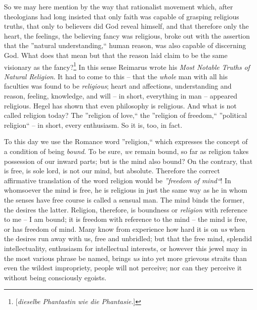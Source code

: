 \documentclass[12pt,a4paper]{book}
\begin{document}
So we may here mention by the way that rationalist movement which, after 
theologians had long insisted that only faith was capable of grasping 
religious truths, that only to believers did God reveal himself, and that 
therefore only the heart, the feelings, the believing fancy was religious, 
broke out with the assertion that the ''natural understanding,`` human 
reason, was also capable of discerning God. What does that mean but that the 
reason laid claim to be the same visionary as the 
fancy?\footnote{[\textit{dieselbe Phantastin wie die Phantasie.}]} In this 
sense Reimarus wrote his \textit{Most Notable Truths of Natural Religion}. It 
had to come to this -- that the \textit{whole} man with all his faculties was 
found to be \textit{religious}; heart and affections, understanding and 
reason, feeling, knowledge, and will -- in short, everything in man -- 
appeared religious. Hegel has shown that even philosophy is religious. And 
what is not called religion today? The ''religion of love,`` the ''religion 
of freedom,`` ''political religion`` -- in short, every enthusiasm. So it 
is, too, in fact.

To this day we use the Romance word ''religion,`` which expresses the 
concept of a condition of being \textit{bound}. To be sure, \textit{we} remain 
bound, so far as religion takes possession of our inward parts; but is the 
mind also bound? On the contrary, that is free, is sole lord, is not our mind, 
but absolute. Therefore the correct affirmative translation of the word 
religion would be \textit{''freedom of mind``}! In whomsoever the mind is 
free, he is religious in just the same way as he in whom the senses have free 
course is called a sensual man. The mind binds the former, the desires the 
latter. Religion, therefore, is boundness or \textit{religion} with reference 
to me -- I am bound; it is freedom with reference to the mind -- the mind is 
free, or has freedom of mind. Many know from experience how hard it is on 
\textit{us} when the desires run away with us, free and unbridled; but that 
the free mind, splendid intellectuality, enthusiasm for intellectual 
interests, or however this jewel may in the most various phrase be named, 
brings \textit{us} into yet more grievous straits than even the wildest 
impropriety, people will not perceive; nor can they perceive it without being 
consciously egoists.
\end{document}
